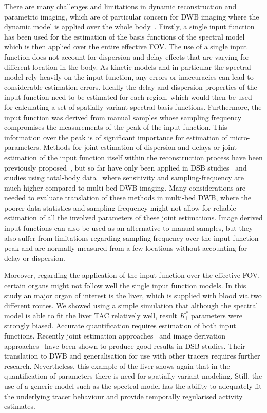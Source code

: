 There are many challenges and limitations in dynamic reconstruction and parametric imaging, which are of particular concern for DWB imaging where the dynamic model is applied over the whole body~\cite{Gallezot2019}. 
Firstly, a single input function has been used for the estimation of the basis functions of the spectral model which is then applied over the entire effective FOV. The use of a single input function does not account for dispersion and delay effects that are varying for different location in the body. As kinetic models and in particular the spectral model rely heavily on the input function, any errors or inaccuracies can lead to considerable estimation errors. Ideally the delay and dispersion properties of the input function need to be estimated for each region, which would then be used for calculating a set of spatially variant spectral basis functions.
Furthermore, the input function was derived from manual samples whose sampling frequency compromises the measurements of the peak of the input function. This information over the peak is of significant importance for estimation of micro-parameters. 
Methods for joint-estimation of dispersion and delays or joint estimation of the input function itself within the reconstruction process have been previously proposed~\cite{Wang2013,Reader2014}, but so far have only been applied in DSB studies~\cite{Reader2014} and studies using total-body data~\cite{Feng2019} where sensitivity and sampling-frequency are much higher compared to multi-bed DWB imaging.
Many considerations are needed to evaluate translation of these methods in multi-bed DWB, where the poorer data statistics and sampling frequency might not allow for reliable estimation of all the involved parameters of these joint estimations. 
Image derived input functions can also be used as an alternative to manual samples, but they also suffer from limitations regarding sampling frequency over the input function peak and are normally measured from a few locations without accounting for delay or dispersion. 

Moreover, regarding the application of the input function over the effective FOV, certain organs might not follow well the single input function models. 
In this study an major organ of interest is the liver, which is supplied with blood via two different routes. We showed using a simple simulation that although the spectral model is able to fit the liver TAC relatively well, result $K_1^{*}$ parameters were strongly biased. Accurate quantification requires estimation of both input functions. Recently joint estimation approaches~\cite{Wang2018} and image derivation approaches~\cite{Wang2021} have been shown to produce good results in DSB studies. Their translation to DWB and generalisation for use with other tracers requires further research. Nevertheless, this example of the liver shows again that in the quantification of parameters there is need for spatially variant modeling. Still, the use of a generic model such as the spectral model has the ability to adequately fit the underlying tracer behaviour and provide temporally regularised activity estimates.

